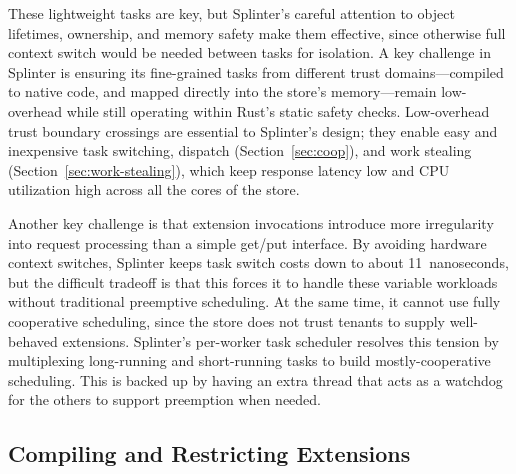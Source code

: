 These lightweight tasks are key, but Splinter's careful attention to object lifetimes, ownership, and memory safety
  make them effective, since otherwise full context switch would be needed between
  tasks for isolation.
A key challenge in Splinter is ensuring its fine-grained tasks from different
  trust domains---compiled to native code, and mapped directly into
  the store's memory---remain low-overhead while still operating within Rust's static
  safety checks.
Low-overhead trust boundary crossings are essential to Splinter's
  design;
they enable easy and inexpensive task switching, dispatch
(Section~\ref{sec:coop}), and work stealing (Section~\ref{sec:work-stealing}),
  which keep response latency low and CPU utilization high across all the cores
  of the store.


Another key challenge is that extension invocations introduce more irregularity into request processing
  than a simple get/put interface.
By avoiding hardware context switches, Splinter keeps task switch costs down
    to about 11~nanoseconds, but the difficult tradeoff is that this forces
    it to handle these variable workloads without traditional
    preemptive scheduling.
At the same time, it cannot use fully cooperative scheduling, since the store
    does not trust tenants to supply well-behaved extensions.
Splinter's per-worker task scheduler resolves this tension by multiplexing
    long-running and short-running tasks to
    build mostly-cooperative scheduling.
This is backed up by having an extra thread that acts as a watchdog for the others to support
    preemption when needed.

\subsection{Compiling and Restricting Extensions}
\label{sec:compile}

